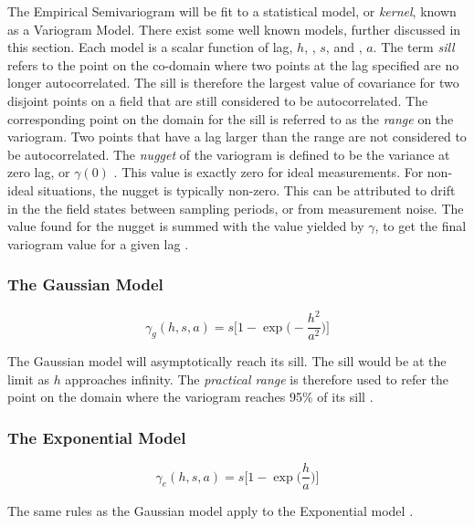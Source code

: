The Empirical Semivariogram will be fit to a statistical model, or \textit{kernel}, known as a Variogram Model. There exist some well known models, further discussed in this section. Each model is a scalar function of lag, $h$, , $s$, and , $a$. The term \textit{sill} refers to the point on the co-domain where two points at the lag specified are no longer autocorrelated. The sill is therefore the largest value of covariance for two disjoint points on a field that are still considered to be autocorrelated. The corresponding point on the domain for the sill is referred to as the \textit{range} on the variogram. Two points that have a lag larger than the range are not considered to be autocorrelated. The \textit{nugget} of the variogram is defined to be the variance at zero lag, or $\gamma(0)$ \cite{matheron:geostat}. This value is exactly zero for ideal measurements. For non-ideal situations, the nugget is typically non-zero. This can be attributed to drift in the the field states between sampling periods, or from measurement noise. The value found for the nugget is summed with the value yielded by $\gamma$, to get the final variogram value for a given lag \cite{goov:97}.

\subsubsection{The Gaussian Model}

\begin{equation}
	\gamma_g(h, s, a) = s \Bigg[ 1 - \exp \Bigg( -\dfrac{h^2}{a^2} \Bigg) \Bigg]
	\label{eq:gauss_model}
\end{equation}

The Gaussian model will asymptotically reach its sill. The sill would be at the limit as $h$ approaches infinity. The \textit{practical range} is therefore used to refer the point on the domain where the variogram reaches 95\% of its sill \cite{goov:97}.

\subsubsection{The Exponential Model}

\begin{equation}
	\gamma_e(h, s, a) = s \Bigg[ 1 - \exp \Bigg( \dfrac{h}{a} \Bigg) \Bigg]
	\label{eq:exp_model}
\end{equation}

The same rules as the Gaussian model apply to the Exponential model \cite{goov:97}.

